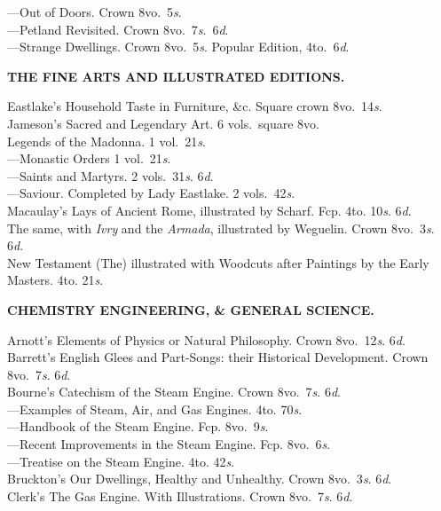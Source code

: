 \documentclass[letterpaper,12pt,oneside,openany]{memoir}
\newcommand{\D}{\hspace*{5mm}}
\newcommand{\E}{\hspace*{2mm}---\hspace*{2mm}}
\begin{document}
\begin{footnotesize}
\E Out of Doors. Crown 8vo.\ 5\textit{s}.\\
\E Petland Revisited. Crown 8vo.\ 7\textit{s}.\ 6\textit{d}.\\
\E Strange Dwellings. Crown 8vo.\ 5\textit{s}. Popular Edition, 4to.\ 6\textit{d}.
\begin{center}
\textbf{THE FINE ARTS AND ILLUSTRATED EDITIONS.}
\end{center}
Eastlake's Household Taste in Furniture, \&c. Square crown 8vo.\ 14\textit{s}.\\
Jameson's Sacred and Legendary Art. 6 vols.\ square 8vo.\\
\D Legends of the Madonna. 1 vol.\ 21\textit{s}.\\
\D \E Monastic Orders 1 vol.\ 21\textit{s}.\\
\D \E Saints and Martyrs. 2 vols.\ 31\textit{s}. 6\textit{d}.\\
\D \E Saviour. Completed by Lady Eastlake. 2 vols.\ 42\textit{s}.\\
Macaulay's Lays of Ancient Rome, illustrated by Scharf. Fcp. 4to. 10\textit{s}. 6\textit{d}.\\
The same, with \textit{Ivry} and the \textit{Armada}, illustrated by Weguelin. Crown 8vo.\ 3\textit{s}. 6\textit{d}.\\
New Testament (The) illustrated with Woodcuts after Paintings by the Early Masters. 4to. 21\textit{s}.
\begin{center}
\textbf{CHEMISTRY ENGINEERING, \& GENERAL SCIENCE.}
\end{center}
Arnott's Elements of Physics or Natural Philosophy. Crown 8vo.\ 12\textit{s}. 6\textit{d}.\\
Barrett's English Glees and Part-Songs: their Historical Development. Crown 8vo.\ 7\textit{s}. 6\textit{d}.\\
Bourne's Catechism of the Steam Engine. Crown 8vo.\ 7\textit{s}. 6\textit{d}.\\
\E Examples of Steam, Air, and Gas Engines. 4to. 70\textit{s}.\\
\E Handbook of the Steam Engine. Fcp. 8vo.\ 9\textit{s}.\\
\E Recent Improvements in the Steam Engine. Fcp. 8vo.\ 6\textit{s}.\\
\E Treatise on the Steam Engine. 4to. 42\textit{s}.\\
Bruckton's Our Dwellings, Healthy and Unhealthy. Crown 8vo.\ 3\textit{s}. 6\textit{d}.\\
Clerk's The Gas Engine. With Illustrations. Crown 8vo.\ 7\textit{s}. 6\textit{d}.\\

\end{footnotesize}
\end{document}
